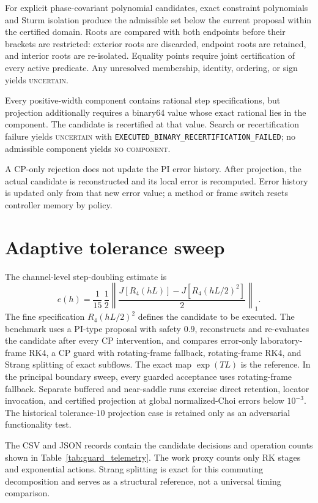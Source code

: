\documentclass[11pt]{article}
\begin{document}
For explicit phase-covariant polynomial candidates, exact constraint polynomials and Sturm isolation produce the admissible set below the current proposal within the certified domain. Roots are compared with both endpoints before their brackets are restricted: exterior roots are discarded, endpoint roots are retained, and interior roots are re-isolated. Equality points require joint certification of every active predicate. Any unresolved membership, identity, ordering, or sign yields \textsc{uncertain}.

Every positive-width component contains rational step specifications, but projection additionally requires a binary64 value whose exact rational lies in the component. The candidate is recertified at that value. Search or recertification failure yields \textsc{uncertain} with \texttt{EXECUTED\_BINARY\_RECERTIFICATION\_FAILED}; no admissible component yields \textsc{no component}.

A CP-only rejection does not update the PI error history. After projection, the actual candidate is reconstructed and its local error is recomputed. Error history is updated only from that new error value; a method or frame switch resets controller memory by policy.

\section{Adaptive tolerance sweep}
The channel-level step-doubling estimate is
\begin{equation}
 e(h)=\frac1{15}\,\frac12\left\|\frac{J[R_4(hL)]-J[R_4(hL/2)^2]}{2}\right\|_1.
\end{equation}
The fine specification $R_4(hL/2)^2$ defines the candidate to be executed. The benchmark uses a PI-type proposal with safety $0.9$, reconstructs and re-evaluates the candidate after every CP intervention, and compares error-only laboratory-frame RK4, a CP guard with rotating-frame fallback, rotating-frame RK4, and Strang splitting of exact subflows. The exact map $\exp(TL)$ is the reference. In the principal boundary sweep, every guarded acceptance uses rotating-frame fallback. Separate buffered and near-saddle runs exercise direct retention, locator invocation, and certified projection at global normalized-Choi errors below $10^{-3}$. The historical tolerance-$10$ projection case is retained only as an adversarial functionality test.



The CSV and JSON records contain the candidate decisions and operation counts shown in Table~\ref{tab:guard_telemetry}. The work proxy counts only RK stages and exponential actions. Strang splitting is exact for this commuting decomposition and serves as a structural reference, not a universal timing comparison.
\end{document}
